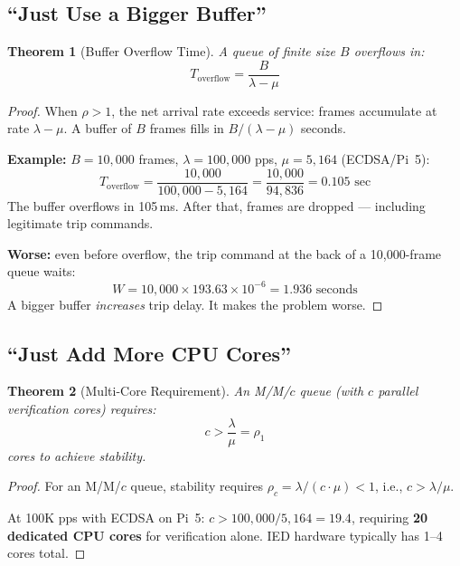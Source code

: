 \documentclass[11pt,a4paper,twocolumn]{article}
\newtheorem{theorem}{Theorem}
\begin{document}
\subsection{``Just Use a Bigger Buffer''}

\begin{theorem}[Buffer Overflow Time]
A queue of finite size $B$ overflows in:
\begin{equation}
T_{\text{overflow}} = \frac{B}{\lambda - \mu}
\end{equation}
\end{theorem}

\begin{proof}
When $\rho > 1$, the net arrival rate exceeds service: frames accumulate at rate $\lambda - \mu$. A buffer of $B$ frames fills in $B / (\lambda - \mu)$ seconds.

\textbf{Example:} $B = 10{,}000$ frames, $\lambda = 100{,}000$ pps, $\mu = 5{,}164$ (ECDSA/Pi~5):
\begin{equation}
T_{\text{overflow}} = \frac{10{,}000}{100{,}000 - 5{,}164} = \frac{10{,}000}{94{,}836} = 0.105 \text{ sec}
\end{equation}
The buffer overflows in 105\,ms. After that, frames are dropped --- including legitimate trip commands.

\textbf{Worse:} even before overflow, the trip command at the back of a 10{,}000-frame queue waits:
\begin{equation}
W = 10{,}000 \times 193.63 \times 10^{-6} = 1.936 \text{ seconds}
\end{equation}
A bigger buffer \emph{increases} trip delay. It makes the problem worse.
\end{proof}

\subsection{``Just Add More CPU Cores''}

\begin{theorem}[Multi-Core Requirement]
An M/M/$c$ queue (with $c$ parallel verification cores) requires:
\begin{equation}
c > \frac{\lambda}{\mu} = \rho_1
\end{equation}
cores to achieve stability.
\end{theorem}

\begin{proof}
For an M/M/$c$ queue, stability requires $\rho_c = \lambda / (c \cdot \mu) < 1$, i.e., $c > \lambda / \mu$.

At 100K pps with ECDSA on Pi~5: $c > 100{,}000 / 5{,}164 = 19.4$, requiring \textbf{20 dedicated CPU cores} for verification alone. IED hardware typically has 1--4 cores total.
\end{proof}
\end{document}
